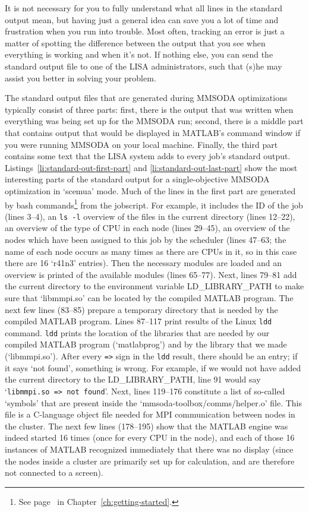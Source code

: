 It is not necessary for you to fully understand what all lines in the standard output mean, but having just a general idea can save you a lot of time and frustration when you run into trouble. Most often, tracking an error is just a matter of spotting the difference between the output that you see when everything is working and when it's not. If nothing else, you can send the standard output file to one of the LISA administrators, such that (s)he may assist you better in solving your problem.

The standard output files that are generated during MMSODA optimizations typically consist of three parts: first, there is the output that was written when everything was being set up for the MMSODA run; second, there is a middle part that contains output that would be displayed in MATLAB's command window if you were running MMSODA on your local machine. Finally, the third part contains some text that the LISA system adds to every job's standard output. Listings~\ref{li:standard-out-first-part} and \ref{li:standard-out-last-part} show the most interesting parts of the standard output for a single-objective MMSODA optimization in `scemua' mode. Much of the lines in the first part are generated by bash commands\footnote{See page~\pageref{word:bash} in Chapter~\ref{ch:getting-started}.} from the jobscript. For example, it includes the ID of the job (lines 3--4), an \texttt{ls -l} overview of the files in the current directory (lines 12--22), an overview of the type of CPU in each node (lines 29--45), an overview of the nodes which have been assigned to this job by the scheduler (lines 47--63; the name of each node occurs as many times as there are CPUs in it, so in this case there are 16 `r41n3' entries). Then the necessary modules are loaded and an overview is printed of the available modules (lines 65--77). Next, lines 79--81 add the current directory to the environment variable LD\_LIBRARY\_PATH to make sure that `libmmpi.so' can be located by the compiled MATLAB program. The next few lines (83--85) prepare a temporary directory that is needed by the compiled MATLAB program. Lines 87--117 print results of the Linux \texttt{ldd} command. \texttt{ldd} prints the location of the libraries that are needed by our compiled MATLAB program (`matlabprog') and by the library that we made (`libmmpi.so'). After every \texttt{=>} sign in the \texttt{ldd} result, there should be an entry; if it says `not found', something is wrong. For example, if we would not have added the current directory to the LD\_LIBRARY\_PATH, line 91 would say `\texttt{libmmpi.so => not found}'. Next, lines 119--176 constitute a list of so-called `symbols' that are present inside the `mmsoda-toolbox/comms/helper.o' file. This file is a C-language object file needed for MPI communication between nodes in the cluster. The next few lines (178--195) show that the MATLAB engine was indeed started 16 times (once for every CPU in the node), and each of those 16 instances of MATLAB recognized immediately that there was no display (since the nodes inside a cluster are primarily set up for calculation, and are therefore not connected to a screen).


